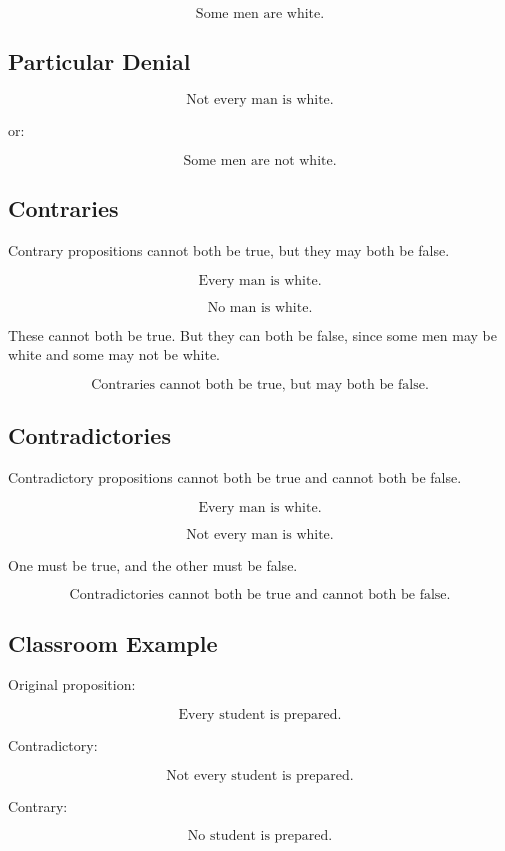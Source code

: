 \documentclass[12pt]{article}
\begin{document}
\[
\text{Some men are white.}
\]

\subsection*{Particular Denial}

\[
\text{Not every man is white.}
\]

or:

\[
\text{Some men are not white.}
\]

\subsection*{Contraries}

Contrary propositions cannot both be true, but they may both be false.

\[
\text{Every man is white.}
\]

\[
\text{No man is white.}
\]

These cannot both be true. But they can both be false, since some men may be
white and some may not be white.

\[
\boxed{
\text{Contraries cannot both be true, but may both be false.}
}
\]

\subsection*{Contradictories}

Contradictory propositions cannot both be true and cannot both be false.

\[
\text{Every man is white.}
\]

\[
\text{Not every man is white.}
\]

One must be true, and the other must be false.

\[
\boxed{
\text{Contradictories cannot both be true and cannot both be false.}
}
\]

\subsection*{Classroom Example}

Original proposition:

\[
\text{Every student is prepared.}
\]

Contradictory:

\[
\text{Not every student is prepared.}
\]

Contrary:

\[
\text{No student is prepared.}
\]
\end{document}
